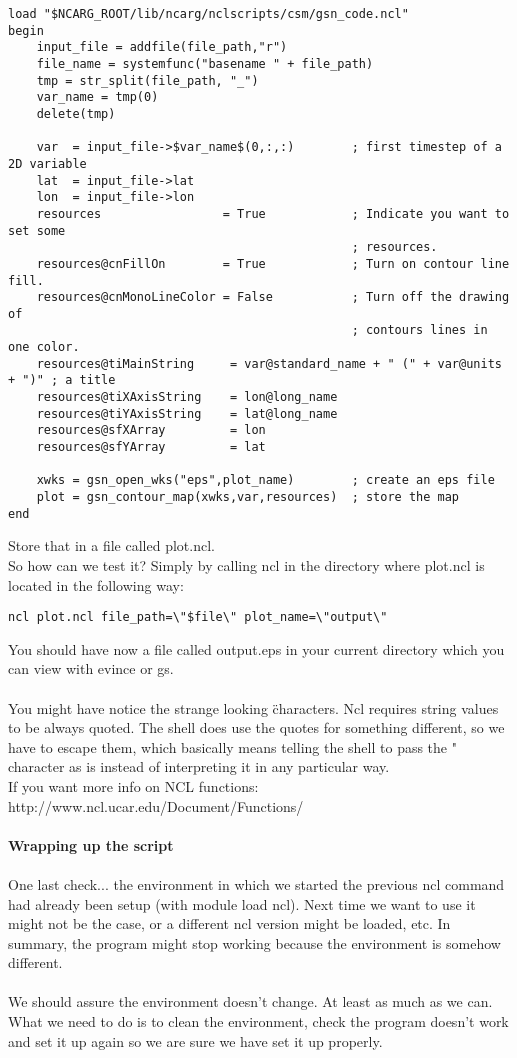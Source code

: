 \documentclass[a4paper,11pt]{ltxdoc}
\begin{document}
\begin{lstlisting}
load "$NCARG_ROOT/lib/ncarg/nclscripts/csm/gsn_code.ncl" 
begin
    input_file = addfile(file_path,"r")
    file_name = systemfunc("basename " + file_path)
    tmp = str_split(file_path, "_")
    var_name = tmp(0)
    delete(tmp)

    var  = input_file->$var_name$(0,:,:)        ; first timestep of a 2D variable
    lat  = input_file->lat                      
    lon  = input_file->lon                      
    resources                 = True            ; Indicate you want to set some
                                                ; resources.
    resources@cnFillOn        = True            ; Turn on contour line fill.
    resources@cnMonoLineColor = False           ; Turn off the drawing of
                                                ; contours lines in one color.
    resources@tiMainString     = var@standard_name + " (" + var@units + ")" ; a title
    resources@tiXAxisString    = lon@long_name
    resources@tiYAxisString    = lat@long_name
    resources@sfXArray         = lon
    resources@sfYArray         = lat

    xwks = gsn_open_wks("eps",plot_name)        ; create an eps file
    plot = gsn_contour_map(xwks,var,resources)  ; store the map
end
\end{lstlisting}

Store that in a file called plot.ncl. \\

So how can we test it? Simply by calling ncl in the directory where plot.ncl is located in the following way:
\begin{lstlisting}
ncl plot.ncl file_path=\"$file\" plot_name=\"output\" 
\end{lstlisting}
You should have now a file called output.eps in your current directory which you can view with evince or gs. \\
\\
You might have notice the strange looking \" characters. Ncl requires string values to be always quoted. The shell does use the quotes for something different, so we have to escape them, which basically means telling the shell to pass the " character as is instead of interpreting it in any particular way.
\\
If you want more info on NCL functions: http://www.ncl.ucar.edu/Document/Functions/\\
\\
\textbf{Wrapping up the script}\\
\\
One last check... the environment in which we started the previous ncl command had already been setup (with module load ncl). Next time we want to use it might not be the case, or a different ncl version might be loaded, etc. In summary, the program might stop working because the environment is somehow different.\\
\\
We should assure the environment doesn't change. At least as much as we can.\\
What we need to do is to clean the environment, check the program doesn't work and set it up again so we are sure we have set it up properly.\\
\end{document}
